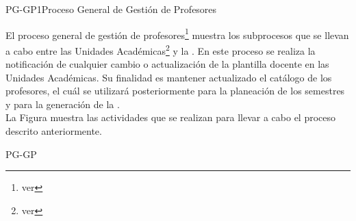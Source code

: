 


\begin{procesoGeneral}{PG-GP1}{Proceso General de Gestión de Profesores} {
		
		El proceso general de gestión de profesores\footnote{ver } muestra los subprocesos que se llevan a cabo entre las Unidades Académicas\footnote{ver } y la . En este proceso se realiza la notificación de cualquier cambio o actualización de la plantilla docente en las Unidades Académicas. Su finalidad es mantener actualizado el catálogo de los profesores, el cuál se utilizará posteriormente para la planeación de los semestres y para la generación de la .\\
					
		\noindent La Figura  muestra las actividades que se realizan para llevar a cabo el proceso descrito anteriormente.
		
	}{PG-GP}

\end{procesoGeneral}

